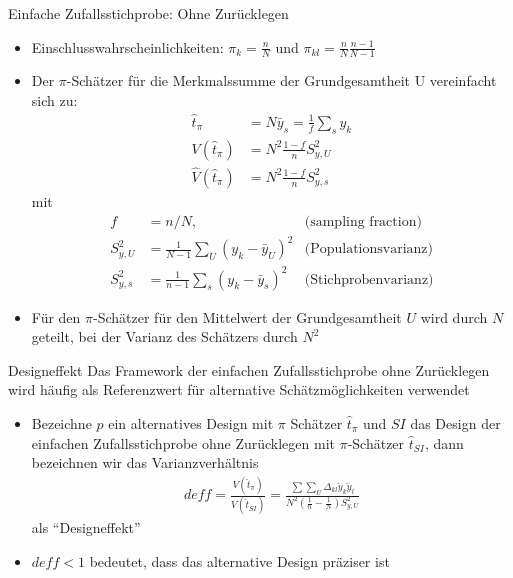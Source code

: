 \documentclass[9pt]{beamer}
\begin{document}
\begin{frame}{Einfache Zufallsstichprobe: Ohne Zurücklegen}
\begin{itemize}
	\item Einschlusswahrscheinlichkeiten: $\pi_k = \frac{n}{N}$ und $\pi_{kl}=\frac{n}{N}\frac{n-1}{N-1}$
	\item Der $\pi$-Schätzer für die Merkmalssumme der Grundgesamtheit U vereinfacht sich zu:
	\begin{align*}
	\hat{t}_\pi &= N \bar{y}_s = \frac{1}{f}\sum_s y_k\\
	V(\hat{t}_\pi) &= N^2 \frac{1-f}{n}S_{y,U}^2\\
	\hat{V}(\hat{t}_\pi) &= N^2 \frac{1-f}{n}S_{y,s}^2
	\end{align*}
	mit 
	\begin{align*}
	f&=n/N, & \text{(sampling fraction)}\\
	S_{y,U}^2&=\frac{1}{N-1}\sum_U (y_k - \bar{y}_U)^2 & \text{(Populationsvarianz)}\\
	S_{y,s}^2&=\frac{1}{n-1}\sum_s (y_k - \bar{y}_s)^2 & \text{(Stichprobenvarianz)}
	\end{align*}
	\item Für den $\pi$-Schätzer für den Mittelwert der Grundgesamtheit $U$ wird durch $N$ geteilt, bei der Varianz des Schätzers durch $N^2$\end{itemize}
\end{frame}

\begin{frame}{Designeffekt}
Das Framework der einfachen Zufallsstichprobe ohne Zurücklegen wird häufig als Referenzwert für alternative Schätzmöglichkeiten verwendet
\begin{itemize}
	\item Bezeichne $p$ ein alternatives Design mit $\pi$ Schätzer $\hat{t}_\pi$ und $SI$ das Design der einfachen Zufallsstichprobe ohne Zurücklegen mit $\pi$-Schätzer $\hat{t}_{SI}$, dann bezeichnen wir das Varianzverhältnis
	\begin{align*}
	deff = \frac{V(\hat{t}_\pi)}{V(\hat{t}_{SI})} =\frac{\sum\sum_U\Delta_{kl} \check{y}_k \check{y}_l}{N^2\left(\frac{1}{n}-\frac{1}{N}\right)S_{y,U}^2}
	\end{align*}
	als \enquote{Designeffekt}
	\item $deff<1$ bedeutet, dass das alternative Design präziser ist
\end{itemize}
\end{frame}
\end{document}
